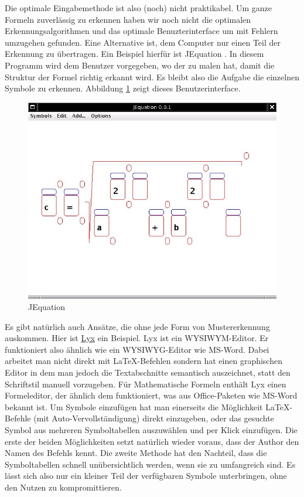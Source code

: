 Die optimale Eingabemethode ist also (noch) nicht praktikabel. Um ganze Formeln zuverlässig zu erkennen haben wir noch nicht die optimalen Erkennungsalgorithmen und das optimale Benuzterinterface um mit Fehlern umzugehen gefunden. Eine Alternative ist, dem Computer nur einen Teil der Erkennung zu übertragen. Ein Beispiel hierfür ist JEquation \cite{jequation}. In diesem Programm wird dem Benutzer vorgegeben, wo der zu malen hat, damit die Struktur der Formel richtig erkannt wird. Es bleibt also die Aufgabe die einzelnen Symbole zu erkennen. Abbildung \ref{fig:jequation} zeigt dieses Benutzerinterface.

\begin{figure}[htbp]
  \begin{center}
    \includegraphics[width=.8\textwidth]{figures/jequation.png}
  \end{center}
  \caption{JEquation}
  \label{fig:jequation}
\end{figure}

Es gibt natürlich auch Ansätze, die ohne jede Form von Mustererkennung auskommen. Hier ist \href{http://lyx.org}{Lyx} ein Beispiel. Lyx ist ein \ac{WYSIWYM}-Editor. Er funktioniert also ähnlich wie ein \ac{WYSIWYG}-Editor wie MS-Word. Dabei arbeitet man nicht direkt mit \LaTeX-Befehlen sondern hat einen graphischen Editor in dem man jedoch die Textabschnitte semantisch auszeichnet, statt den Schriftstil manuell vorzugeben. Für Mathematische Formeln enthält Lyx einen Formeleditor, der ähnlich dem funktioniert, was aus Office-Paketen wie MS-Word bekannt ist. Um Symbole einzufügen hat man einerseits die Möglichkeit \LaTeX-Befehle (mit Auto-Vervollständigung) direkt einzugeben, oder das gesuchte Symbol aus mehreren Symboltabellen auszuwählen und per Klick einzufügen. Die erste der beiden Möglichkeiten setzt natürlich wieder voraus, dass der Author den Namen des Befehls kennt. Die zweite Methode hat den Nachteil, dass die Symboltabellen schnell unübersichtlich werden, wenn sie zu umfangreich sind. Es lässt sich also nur ein kleiner Teil der verfügbaren Symbole unterbringen, ohne den Nutzen zu kompromittieren.


